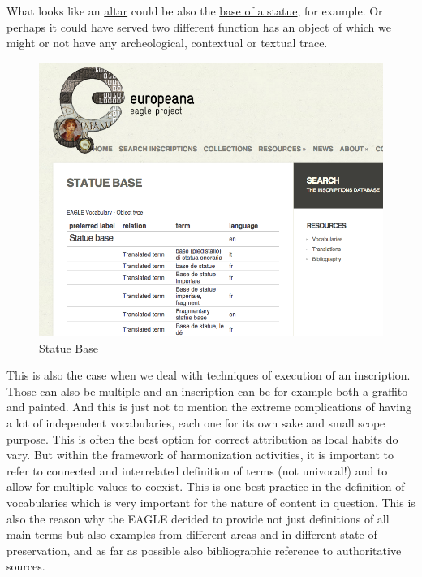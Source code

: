 \documentclass[amsthm,ebook]{saparticle}
\begin{document}
What looks like an \href{http://www.eagle-network.eu/voc/objtyp/lod/29}{altar} could be also the \href{http://www.eagle-network.eu/voc/objtyp/lod/57}{base of a statue}, for example. Or perhaps it could have served two different function has an object of which we might or not have any archeological, contextual or textual trace.  

\begin{figure}[htbp] \includegraphics[width=\columnwidth]{statuebase.png} \caption[]{Statue Base} \end{figure}

This is also the case when we deal with techniques of execution of an inscription. Those can also be multiple and an inscription can be for example both a graffito and painted.
And this is just not to mention the extreme complications of having a lot of independent vocabularies, each one for its own sake and small scope purpose. This is often the best option for correct attribution as local habits do vary. But within the framework of harmonization activities, it is important to refer to connected and interrelated definition of terms (not univocal!) and to allow for multiple values to coexist. This is one best practice in the definition of vocabularies which is very important for the nature of content in question. 
This is also the reason why the EAGLE decided to provide not just definitions of all main terms but also examples from different areas and in different state of preservation, and as far as possible also bibliographic reference to authoritative sources.
\end{document}
